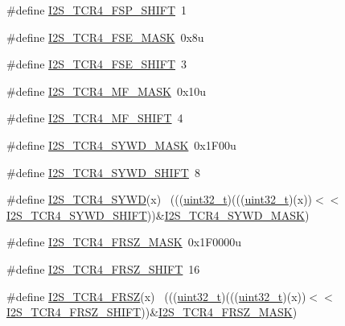 \begin{DoxyCompactItemize}
\item 
\#define \hyperlink{group___i2_s___register___masks_ga48dba321e9103f28b6b66b072dae99b7}{I2\+S\+\_\+\+T\+C\+R4\+\_\+\+F\+S\+P\+\_\+\+S\+H\+I\+FT}~1
\item 
\#define \hyperlink{group___i2_s___register___masks_ga1431c095df0a4ca821052d83ca72ca96}{I2\+S\+\_\+\+T\+C\+R4\+\_\+\+F\+S\+E\+\_\+\+M\+A\+SK}~0x8u
\item 
\#define \hyperlink{group___i2_s___register___masks_ga967f80d877a02e10cfe3041c0547c67f}{I2\+S\+\_\+\+T\+C\+R4\+\_\+\+F\+S\+E\+\_\+\+S\+H\+I\+FT}~3
\item 
\#define \hyperlink{group___i2_s___register___masks_ga3331c691867adbb231a8d1d7ccb4ce94}{I2\+S\+\_\+\+T\+C\+R4\+\_\+\+M\+F\+\_\+\+M\+A\+SK}~0x10u
\item 
\#define \hyperlink{group___i2_s___register___masks_ga63d02d7aac86c3c6389035e2e3a8a96b}{I2\+S\+\_\+\+T\+C\+R4\+\_\+\+M\+F\+\_\+\+S\+H\+I\+FT}~4
\item 
\#define \hyperlink{group___i2_s___register___masks_ga239e1c4ba761520bf2d7e0cf65c39d54}{I2\+S\+\_\+\+T\+C\+R4\+\_\+\+S\+Y\+W\+D\+\_\+\+M\+A\+SK}~0x1\+F00u
\item 
\#define \hyperlink{group___i2_s___register___masks_gadd23753698d7fb9a8948b1db0443fa4f}{I2\+S\+\_\+\+T\+C\+R4\+\_\+\+S\+Y\+W\+D\+\_\+\+S\+H\+I\+FT}~8
\item 
\#define \hyperlink{group___i2_s___register___masks_ga9b09e0c41108f2ccf828a70d32052721}{I2\+S\+\_\+\+T\+C\+R4\+\_\+\+S\+Y\+WD}(x)                                              ~(((\hyperlink{_p_e___types_8h_a33594304e786b158f3fb30289278f5af}{uint32\+\_\+t})(((\hyperlink{_p_e___types_8h_a33594304e786b158f3fb30289278f5af}{uint32\+\_\+t})(x))$<$$<$\hyperlink{group___i2_s___register___masks_gadd23753698d7fb9a8948b1db0443fa4f}{I2\+S\+\_\+\+T\+C\+R4\+\_\+\+S\+Y\+W\+D\+\_\+\+S\+H\+I\+FT}))\&\hyperlink{group___i2_s___register___masks_ga239e1c4ba761520bf2d7e0cf65c39d54}{I2\+S\+\_\+\+T\+C\+R4\+\_\+\+S\+Y\+W\+D\+\_\+\+M\+A\+SK})
\item 
\#define \hyperlink{group___i2_s___register___masks_ga1348cbea02cf3f38b5112c2ed27fafa0}{I2\+S\+\_\+\+T\+C\+R4\+\_\+\+F\+R\+S\+Z\+\_\+\+M\+A\+SK}~0x1\+F0000u
\item 
\#define \hyperlink{group___i2_s___register___masks_ga7db678baf12c9937bc1f2899876ed142}{I2\+S\+\_\+\+T\+C\+R4\+\_\+\+F\+R\+S\+Z\+\_\+\+S\+H\+I\+FT}~16
\item 
\#define \hyperlink{group___i2_s___register___masks_ga6d0a7293dab6f5586b7b2415e9e8eb43}{I2\+S\+\_\+\+T\+C\+R4\+\_\+\+F\+R\+SZ}(x)                                              ~(((\hyperlink{_p_e___types_8h_a33594304e786b158f3fb30289278f5af}{uint32\+\_\+t})(((\hyperlink{_p_e___types_8h_a33594304e786b158f3fb30289278f5af}{uint32\+\_\+t})(x))$<$$<$\hyperlink{group___i2_s___register___masks_ga7db678baf12c9937bc1f2899876ed142}{I2\+S\+\_\+\+T\+C\+R4\+\_\+\+F\+R\+S\+Z\+\_\+\+S\+H\+I\+FT}))\&\hyperlink{group___i2_s___register___masks_ga1348cbea02cf3f38b5112c2ed27fafa0}{I2\+S\+\_\+\+T\+C\+R4\+\_\+\+F\+R\+S\+Z\+\_\+\+M\+A\+SK})

\end{DoxyCompactItemize}
